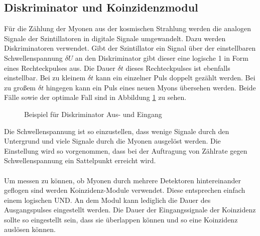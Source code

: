 \newpage

\subsection{Diskriminator und Koinzidenzmodul}
Für die Zählung der Myonen aus der kosmischen Strahlung werden die analogen Signale der Szintillatoren in digitale Signale umgewandelt. Dazu werden Diskriminatoren verwendet. Gibt der Szintillator ein Signal über der einstellbaren Schwellenspannung $\delta U$ an den Diskriminator gibt dieser eine logische 1 in Form eines Rechteckpulses aus. Die Dauer $\delta t$ dieses Rechteckpulses ist ebenfalls einstellbar. Bei zu kleinem $\delta t$ kann ein einzelner Puls doppelt gezählt werden. Bei zu großem $\delta t$ hingegen kann ein Puls eines neuen Myons übersehen werden. Beide Fälle sowie der optimale Fall sind in Abbildung \ref{fig:diskriminator} zu sehen.

\begin{figure}[h]
  \centering
  \caption{Beispiel für Diskriminator Aus- und Eingang}
  \label{fig:diskriminator}
\end{figure}

Die Schwellenspannung ist so einzustellen, dass wenige Signale durch den Untergrund und viele Signale durch die Myonen ausgelöst werden. Die Einstellung wird so vorgenommen, dass bei der Auftragung von Zählrate gegen Schwellenspannung ein Sattelpunkt erreicht wird. \\ \\
Um messen zu können, ob Myonen durch mehrere Detektoren hintereinander geflogen sind werden Koinzidenz-Module verwendet. Diese entsprechen einfach einem logischen UND. An dem Modul kann lediglich die Dauer des Ausgangspulses eingestellt werden. Die Dauer der Eingangssignale der Koinzidenz sollte so eingestellt sein, dass sie überlappen können und so eine Koinzidenz auslösen können.
